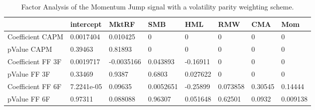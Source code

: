 \begin{table}[H]
\centering
\begin{tabular}{llllllll}
\hline& intercept & MktRF & SMB & HML & RMW & CMA & Mom \\ 
\hline 
Coefficient CAPM & 0.0017404 & 0.010425 & 0 & 0 & 0 & 0 & 0 \\ 
pValue CAPM & 0.39463 & 0.81893 & 0 & 0 & 0 & 0 & 0 \\ 
Coefficient FF 3F & 0.0019717 & -0.0035166 & 0.043893 & -0.16911 & 0 & 0 & 0 \\ 
pValue FF 3F & 0.33469 & 0.9387 & 0.6803 & 0.027622 & 0 & 0 & 0 \\ 
Coefficient FF 6F & 7.2241e-05 & 0.09635 & 0.0052651 & -0.25899 & 0.073858 & 0.30545 & 0.14444 \\ 
pValue FF 6F & 0.97311 & 0.088088 & 0.96307 & 0.051648 & 0.62501 & 0.0932 & 0.009138 \\ 
\hline
\end{tabular}
\caption{Factor Analysis of the Momentum Jump signal with a volatility parity weighting scheme.}
\label{MOMJUMPVP_FACTOR}
\end{table}